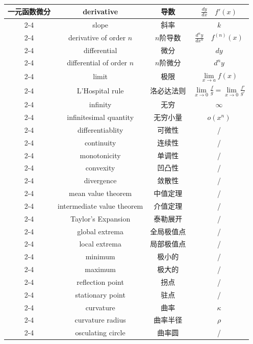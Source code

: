\documentclass{article}
\begin{document}
\begin{longtable}{|c|c|c|c|}
    \multirow{9}{*}{一元函数微分}
    & derivative & 导数 & $\frac{dy}{dx}\quad f'(x)$ \\
    \cline{2-4}
    & slope & 斜率 & $k$ \\
    \cline{2-4}
    & derivative of order $n$ & $n$阶导数 & $\frac{d^{n}y}{dx^n}\quad f^{(n)}(x)$ \\
    \cline{2-4}
    & differential & 微分 & $dy$ \\
    \cline{2-4}
    & differential of order $n$ & $n$阶微分 & $d^{n}y$ \\
    \cline{2-4}
    & limit & 极限 & $\lim\limits_{x \to a}f(x)$ \\
    \cline{2-4}
    & L'Hospital rule & 洛必达法则 & $\lim\limits_{x \to 0}\frac{f}{g}=\lim\limits_{x \to 0}\frac{f'}{g'}$ \\
    \cline{2-4}
    & infinity & 无穷 & $\infty$ \\
    \cline{2-4}
    & infinitesimal quantity & 无穷小量 & $o(x^n)$ \\
    \cline{2-4}
    \multirow{17}{*}{一元函数微分}
    & differentiablity & 可微性 & / \\
    \cline{2-4}
    & continuity & 连续性 & / \\
    \cline{2-4}
    & monotonicity & 单调性 & / \\
    \cline{2-4}
    & convexity & 凹凸性 & / \\
    \cline{2-4}
    & divergence & 敛散性 & / \\
    \cline{2-4}
    & mean value theorem & 中值定理 & / \\
    \cline{2-4}
    & intermediate value theorem & 介值定理 & / \\
    \cline{2-4}
    & Taylor's Expansion & 泰勒展开 & / \\
    \cline{2-4}
    & global extrema & 全局极值点 & / \\
    \cline{2-4}
    & local extrema & 局部极值点 & / \\
    \cline{2-4}
    & minimum & 极小的 & / \\
    \cline{2-4}
    & maximum & 极大的 & / \\
    \cline{2-4}
    & reflection point & 拐点 & / \\
    \cline{2-4}
    & stationary point & 驻点 & / \\
    \cline{2-4}
    & curvature & 曲率 & $\kappa$ \\
    \cline{2-4}
    & curvature radius & 曲率半径 & $\rho$ \\
    \cline{2-4}
    & osculating circle & 曲率圆 & / \\

\end{longtable}
\end{document}
